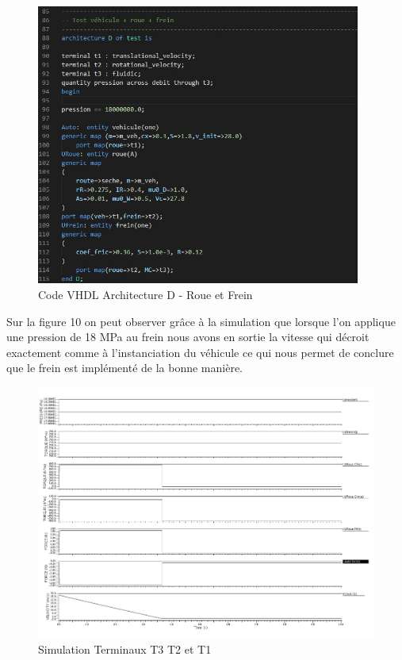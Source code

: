 \begin{figure}[h]
    \centering
    \includegraphics[width=0.95\textwidth]{images/Instanciation_frein.jpg}
    \caption{Code VHDL Architecture D - Roue et Frein}
\end{figure}
\newpage
Sur la figure 10 on peut observer grâce à la simulation que lorsque l'on applique une pression de 18 MPa au frein nous avons en sortie la vitesse qui décroit exactement comme à l'instanciation du véhicule ce qui nous permet de conclure que le frein est implémenté de la bonne manière.
\begin{figure}[h]
    \centering
    \includegraphics[width=\textwidth]{images/Instanciation_vehicule_roue_frein.jpg}
    \caption{Simulation Terminaux T3 T2 et T1}
\end{figure} 

